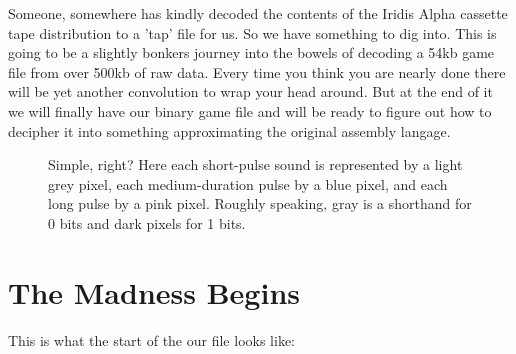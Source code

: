 Someone, somewhere has kindly decoded the contents of the Iridis Alpha cassette tape distribution to
a 'tap' file for us. So we have something to dig into. This is going to be a slightly bonkers journey
into the bowels of decoding a 54kb game file from over 500kb of raw data. Every time you think you
are nearly done there will be yet another convolution to wrap your head around. But at the end of it
we will finally have our binary game file and will be ready to figure out how to decipher it into something
approximating the original assembly langage.

\begin{figure}[H]
  {
    \begin{adjustbox}{width=10cm,center}
    \end{adjustbox}
  }\caption[]{Simple, right? Here each short-pulse sound is represented by a light grey pixel, each medium-duration pulse by a blue pixel,
and each long pulse by a pink pixel. Roughly speaking, gray is a shorthand for 0 bits and dark pixels for 1 bits.}
\end{figure}

\section{The Madness Begins}

This is what the start of the our  file looks like:


